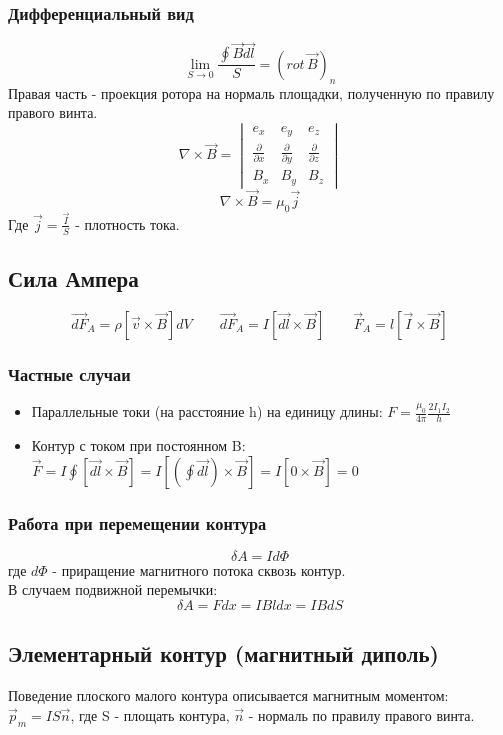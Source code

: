 \documentclass{article}
\begin{document}
\subsubsection{Дифференциальный вид}
\[\lim_{S \to 0}\frac{\oint\vec{B}\vec{dl}}{S}=(rot\,\vec{B})_{n}\]
Правая часть - проекция ротора на нормаль площадки, полученную по правилу правого винта.
\[
    \nabla \times \vec{B} = \begin{vmatrix}
        e_{x}                       & e_{y}                       & e_{z}                       \\
        \frac{\partial}{\partial x} & \frac{\partial}{\partial y} & \frac{\partial}{\partial z} \\
        B_{x}                       & B_{y}                       & B_{z}
    \end{vmatrix}
\]
\[
    \nabla \times \vec{B} = \mu_{0}\vec{j}
\]
Где $\vec{j}=\frac{\vec{I}}{S}$ - плотность тока.

\subsection{Сила Ампера}
\[
    \vec{dF}_{A}=\rho[\vec{v}\times\vec{B}]dV \qquad
    \vec{dF}_{A}=I[\vec{dl}\times\vec{B}] \qquad
    \vec{F}_{A}=l[\vec{I}\times\vec{B}]
\]
\subsubsection{Частные случаи}
\begin{itemize}
    \item Параллельные токи (на расстояние h) на единицу длины: $F = \frac{\mu_{0}}{4\pi}\frac{2I_{1}I_{2}}{h}$
    \item Контур с током при постоянном B: $\vec{F}=I\oint[\vec{dl}\times\vec{B}]=I[(\oint\vec{dl})\times\vec{B}]=I[0\times\vec{B}]=0$
\end{itemize}
\subsubsection{Работа при перемещении контура}
\[\delta A=Id\Phi \]
где $d\Phi$ - приращение магнитного потока сквозь контур.\\
В случаем подвижной перемычки:
\[\delta A=Fdx=IBldx=IBdS\]

\subsection{Элементарный контур (магнитный диполь)}
Поведение плоского малого контура описывается магнитным моментом: $\vec{p}_{m}=IS\vec{n}$, где S - площать контура, $\vec{n}$ - нормаль по правилу правого винта.
\end{document}
